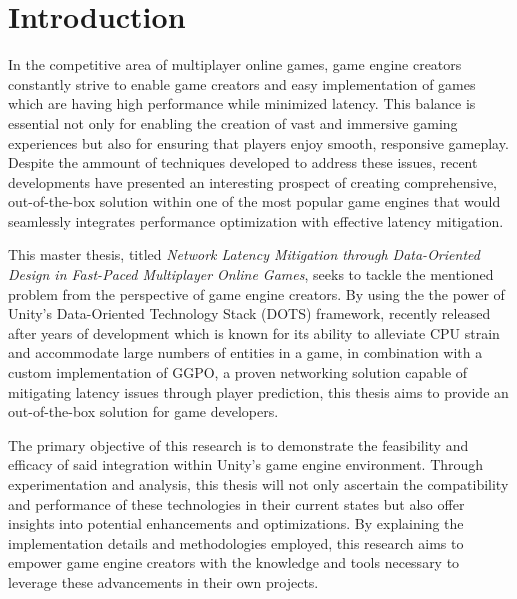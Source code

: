 \chapter{Introduction} 



In the competitive area of multiplayer online games, game engine creators constantly strive to enable game creators and easy implementation of games which are having high performance while minimized latency. This balance is essential not only for enabling the creation of vast and immersive gaming experiences but also for ensuring that players enjoy smooth, responsive gameplay. Despite the ammount of techniques developed to address these issues, recent developments have presented an interesting prospect of creating comprehensive, out-of-the-box solution within one of the most popular game engines that would seamlessly integrates performance optimization with effective latency mitigation.

This master thesis, titled \textit{Network Latency Mitigation through Data-Oriented Design in Fast-Paced Multiplayer Online Games}, seeks to tackle the mentioned problem from the perspective of game engine creators. By using the the power of Unity's Data-Oriented Technology Stack (DOTS) framework, recently released after years of development which is known for its ability to alleviate CPU strain and accommodate large numbers of entities in a game, in combination with a custom implementation of GGPO, a proven networking solution capable of mitigating latency issues through player prediction, this thesis aims to provide an out-of-the-box solution for game developers.

The primary objective of this research is to demonstrate the feasibility and efficacy of said integration within Unity's game engine environment. Through experimentation and analysis, this thesis will not only ascertain the compatibility and performance of these technologies in their current states but also offer insights into potential enhancements and optimizations. By explaining the implementation details and methodologies employed, this research aims to empower game engine creators with the knowledge and tools necessary to leverage these advancements in their own projects.



